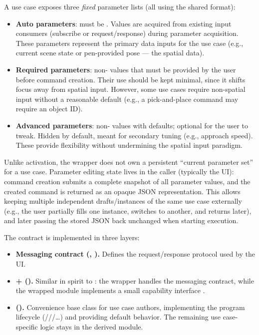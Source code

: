 A use case exposes three \emph{fixed} parameter lists (all using the shared  format):
\begin{itemize}
    \item \textbf{Auto parameters}: must be . Values are acquired from existing input consumers (subscribe or request/response) during parameter acquisition. These parameters represent the primary data inputs for the use case (e.g., current scene state or pen-provided pose --- the spatial data).
    \item \textbf{Required parameters}: non- values that must be provided by the user before command creation. Their use should be kept minimal, since it shifts focus away from spatial input. However, some use cases require non-spatial input without a reasonable default (e.g., a pick-and-place command may require an object ID).
    \item \textbf{Advanced parameters}: non- values with defaults; optional for the user to tweak. Hidden by default, meant for secondary tuning (e.g., approach speed). These provide flexibility without undermining the spatial input paradigm.
\end{itemize}

Unlike activation, the wrapper does not own a persistent ``current parameter set'' for a use case. Parameter editing state lives in the caller (typically the UI): command creation submits a complete snapshot of all parameter values, and the created command is returned as an opaque JSON representation. This allows keeping multiple independent drafts/instances of the same use case externally (e.g., the user partially fills one instance, switches to another, and returns later), and later passing the stored JSON back unchanged when starting execution.

The contract is implemented in three layers:
\begin{itemize}
    \item \textbf{Messaging contract (, ).} Defines the request/response protocol used by the UI.
    \item \textbf{ +  ().} Similar in spirit to : the wrapper handles the messaging contract, while the wrapped module implements a small capability interface .
    \item \textbf{ ().} Convenience base class for use case authors, implementing the program lifecycle (///\dots) and providing default  behavior. The remaining use case-specific logic stays in the derived module.
\end{itemize}

